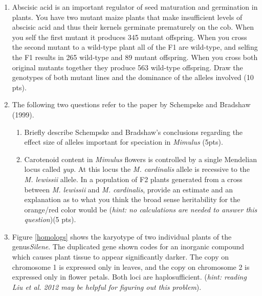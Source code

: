 \documentclass[]{article}
\begin{document}
\begin{enumerate}
\newpage

\item Abscisic acid is an important regulator of seed maturation and germination in plants. You have two mutant maize plants that make insufficient levels of abscisic acid and thus their kernels germinate prematurely on the cob. When you self the first mutant it produces 345 mutant offspring. When you cross the second mutant to a wild-type plant all of the F1 are wild-type, and selfing the F1 results in 265 wild-type and 89 mutant offspring.  When you cross both original mutants together they produce 563 wild-type offspring.  Draw the genotypes of both mutant lines and the dominance of the alleles involved (10 pts).


\newpage
\item The following two questions refer to the paper by Schempske and Bradshaw (1999). 
\begin{enumerate}
\item Briefly describe Schempske and Bradshaw's conclusions regarding the effect size of alleles important for speciation in \emph{Mimulus} (5pts).
\item Carotenoid content in \emph{Mimulus} flowers is controlled by a single Mendelian locus called \emph{yup}. At this locus the \emph{M. cardinalis} allele is recessive to the \emph{M. lewissii} allele. In a population of F2 plants generated from a cross between \emph{M. lewissii}  and \emph{M. cardinalis}, provide an estimate and an explanation as to what you think the broad sense heritability for the orange/red color would be (\emph{hint: no calculations are needed to answer this question})(5 pts).
\end{enumerate}

\newpage
\item Figure \ref{homologs} shows the karyotype of two individual plants of the genus\emph{Silene}.  The duplicated gene shown codes for an inorganic compound which causes plant tissue to appear significantly darker. The copy on chromosome 1 is expressed only in leaves, and the copy on chromosome 2 is expressed only in flower petals. Both loci are haplosufficient. (\emph{hint: reading Liu et al. 2012 may be helpful for figuring out this problem}).


\end{enumerate}
\end{document}
